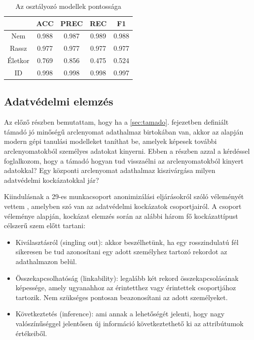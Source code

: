 \begin{table}[ht]
	\centering
	\begin{tabular}{|c|c|c|c|c|}
		\hline
		& ACC & PREC & REC & F1 \\
		\hline
		\hline
		Nem & 0.988 & 0.987 & 0.989 & 0.988 \\
		\hline
		Rassz & 0.977 & 0.977 & 0.977 & 0.977 \\
		\hline
		Életkor & 0.769 & 0.856 & 0.475 & 0.524 \\
		\hline
		ID & 0.998 & 0.998 & 0.998 & 0.997 \\
		\hline
	\end{tabular}
	\caption{Az osztályozó modellek pontossága}
	\label{tab:pontossagok}
\end{table}
 
\subsection{Adatvédelmi elemzés} %
\label{sec:adatvedelmi_elemz}

Az előző részben bemutattam, hogy ha a \ref{sec:tamado}. fejezetben definiált támadó jó minőségű arclenyomat adathalmaz birtokában van, akkor az alapján modern gépi tanulási modelleket taníthat be, amelyek képesek további arclenyomatokból személyes adatokat kinyerni. Ebben a részben azzal a kérdéssel foglalkozom, hogy a támadó hogyan tud visszaélni az arclenyomatokból kinyert adatokkal? Egy központi arclenyomat adathalmaz kiszivárgása milyen adatvédelmi kockázatokkal jár?

Kiindulásnak a 29-es munkacsoport anonimizálási eljárásokról szóló véleményét vettem \cite{anon2014}, amelyben szó van az adatvédelmi kockázatok csoportjairól. A csoport véleménye alapján, kockázat elemzés során az alábbi három fő kockázattípust célszerű szem előtt tartani:

\begin{itemize}
	\item Kiválasztásról (singling out): akkor beszélhetünk, ha egy rosszindulatú fél sikeresen be tud azonosítani egy adott személyhez tartozó rekordot az adathalmazon belül.
	\item Összekapcsolhatóság (linkability): legalább két rekord összekapcsolásának képessége, amely ugyanahhoz az érintetthez vagy érintettek csoportjához tartozik. Nem szükséges pontosan beazonosítani az adott személyeket.
	\item Következtetés (inference): ami annak a lehetőségét jelenti, hogy nagy valószínűséggel jelentősen új információ következtethető ki az attribútumok értékeiből.
\end{itemize}

